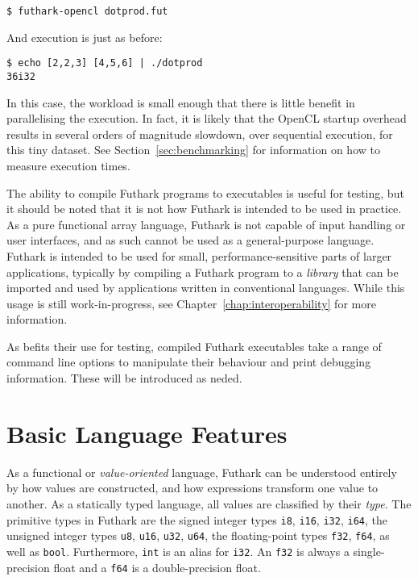 \documentclass[11pt]{book}
\begin{document}
\begin{verbatim}
$ futhark-opencl dotprod.fut
\end{verbatim}

And execution is just as before:

\begin{verbatim}
$ echo [2,2,3] [4,5,6] | ./dotprod
36i32
\end{verbatim}

In this case, the workload is small enough that there is little
benefit in parallelising the execution.  In fact, it is likely that
the OpenCL startup overhead results in several orders of magnitude
slowdown, over sequential execution, for this tiny dataset.  See
Section~\ref{sec:benchmarking} for information on how to measure
execution times.

The ability to compile Futhark programs to executables is useful for
testing, but it should be noted that it is not how Futhark is intended
to be used in practice.  As a pure functional array language, Futhark
is not capable of input handling or user interfaces, and as such
cannot be used as a general-purpose language.  Futhark is intended to
be used for small, performance-sensitive parts of larger applications,
typically by compiling a Futhark program to a \textit{library} that
can be imported and used by applications written in conventional
languages.  While this usage is still work-in-progress, see
Chapter~\ref{chap:interoperability} for more information.

As befits their use for testing, compiled Futhark executables take a
range of command line options to manipulate their behaviour and print
debugging information.  These will be introduced as neded.

\section{Basic Language Features}

As a functional or \textit{value-oriented} language, Futhark can be
understood entirely by how values are constructed, and how expressions
transform one value to another.  As a statically typed language, all
values are classified by their \textit{type}.  The primitive types in
Futhark are the signed integer types \texttt{i8}, \texttt{i16},
\texttt{i32}, \texttt{i64}, the unsigned integer types \texttt{u8},
\texttt{u16}, \texttt{u32}, \texttt{u64}, the floating-point types
\texttt{f32}, \texttt{f64}, as well as \texttt{bool}.  Furthermore,
\texttt{int} is an alias for \texttt{i32}.  An \texttt{f32} is always
a single-precision float and a \texttt{f64} is a double-precision
float.
\end{document}
